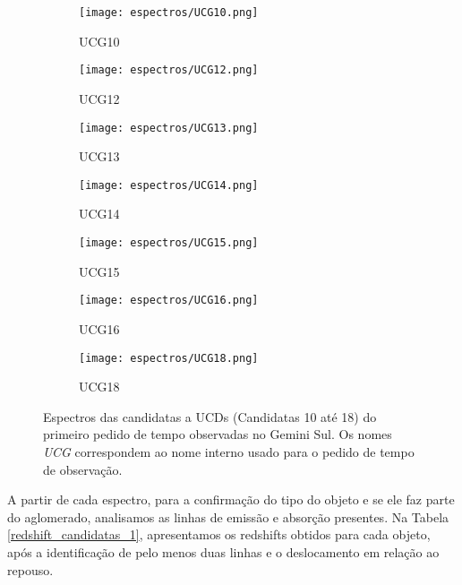 \begin{figure}[H]
    \centering
    \begin{subfigure}[b]{0.45\textwidth}
        \texttt{[image: espectros/UCG10.png]}
        \caption{UCG10}
    \end{subfigure}
    \begin{subfigure}[b]{0.45\textwidth}
        \texttt{[image: espectros/UCG12.png]}
        \caption{UCG12}
    \end{subfigure}
    \begin{subfigure}[b]{0.45\textwidth}
        \texttt{[image: espectros/UCG13.png]}
        \caption{UCG13}
    \end{subfigure}
    \begin{subfigure}[b]{0.45\textwidth}
        \texttt{[image: espectros/UCG14.png]}
        \caption{UCG14}
    \end{subfigure}
    \begin{subfigure}[b]{0.45\textwidth}
        \texttt{[image: espectros/UCG15.png]}
        \caption{UCG15}
    \end{subfigure}
    \begin{subfigure}[b]{0.45\textwidth}
        \texttt{[image: espectros/UCG16.png]}
        \caption{UCG16}
    \end{subfigure}
    \begin{subfigure}[b]{0.45\textwidth}
        \texttt{[image: espectros/UCG18.png]}
        \caption{UCG18}
    \end{subfigure}
    \caption{Espectros das candidatas a UCDs (Candidatas 10 até 18) do primeiro pedido de tempo observadas no Gemini Sul. Os nomes \textit{UCG} correspondem ao nome interno usado para o pedido de tempo de observação.}
    \label{espectros_candidatas_1_p2}
\end{figure}

A partir de cada espectro, para a confirmação do tipo do objeto e se ele faz parte do aglomerado, analisamos as linhas de emissão e absorção presentes. Na Tabela \ref{redshift_candidatas_1}, apresentamos os redshifts obtidos para cada objeto, após a identificação de pelo menos duas linhas e o deslocamento em relação ao repouso.


